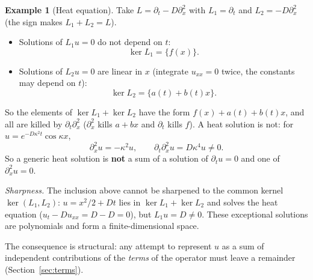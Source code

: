 \documentclass[11pt,a4paper]{article}
\theoremstyle{definition}
\newtheorem{example}{Example}[section]
\begin{document}
\begin{example}[Heat equation]
Take $L=\partial_t-D\partial_x^2$ with $L_1=\partial_t$ and $L_2=-D\partial_x^2$ (the sign makes $L_1+L_2=L$).
\begin{itemize}[nosep]
\item Solutions of $L_1u=0$ do not depend on $t$:
\[\ker L_1=\{f(x)\}.\]
\item Solutions of $L_2u=0$ are linear in $x$ (integrate $u_{xx}=0$ twice, the constants may depend on $t$):
\[\ker L_2=\{a(t)+b(t)x\}.\]
\end{itemize}
So the elements of $\ker L_1+\ker L_2$ have the form $f(x)+a(t)+b(t)x$, and all are killed by $\partial_t\partial_x^2$ ($\partial_x^2$ kills $a+bx$ and $\partial_t$ kills $f$). A heat solution is not: for $u=e^{-D\kappa^2t}\cos\kappa x$,
\[
\partial_x^2u=-\kappa^2u,\qquad \partial_t\partial_x^2u=D\kappa^4u\neq0 .
\]
So a generic heat solution is \textbf{not} a sum of a solution of $\partial_tu=0$ and one of $\partial_x^2u=0$.

\emph{Sharpness.} The inclusion above cannot be sharpened to the common kernel $\ker(L_1,L_2)$: $u=x^2/2+Dt$ lies in $\ker L_1+\ker L_2$ and solves the heat equation ($u_t-Du_{xx}=D-D=0$), but $L_1u=D\neq0$. These exceptional solutions are polynomials and form a finite-dimensional space.
\end{example}
The consequence is structural: any attempt to represent $u$ as a sum of independent contributions of the \emph{terms} of the operator must leave a remainder (Section~\ref{sec:terms}).


\end{document}

